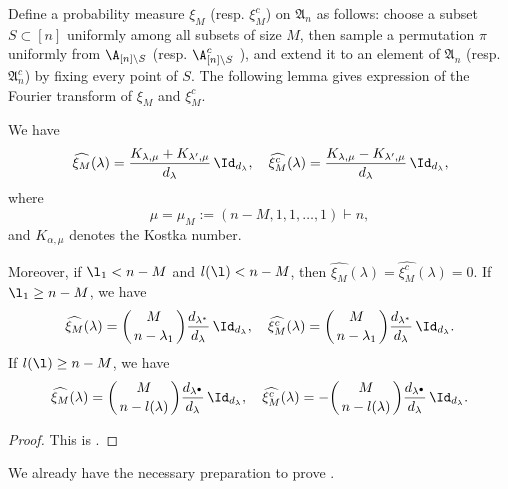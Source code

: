 Define a probability measure $\xi_M$ (resp. $\xi_M^c$) on $\mathfrak{A}_n$ as follows: choose a subset $S\subset[n]$ uniformly among all subsets of size $M$, then sample a permutation $\pi$ uniformly from $\A_{[n]\setminus S}$ (resp. $\A_{[n]\setminus S}^c$ ), and extend it to an element of $\mathfrak{A}_n$ (resp. $\mathfrak{A}_n^c$) by fixing every point of $S$. The following lemma gives expression of the Fourier transform of $\xi_M$ and $\xi_M^c$.

\begin{thm}
\label{thm :zetaM_Fourier_An}
We have
$$
\widehat{\xi_M}(\lambda)=\frac{K_{\lambda,\mu}+K_{\lambda',\mu}}{d_\lambda}\,\Id_{d_\lambda}, \quad\widehat{\xi_M^c}(\lambda)=\frac{K_{\lambda,\mu}-K_{\lambda',\mu}}{d_\lambda}\,\Id_{d_\lambda},
$$
where
$$
\mu=\mu_M:=(n-M,1,1,\dots,1)\vdash n,
$$
and $K_{\alpha,\mu}$ denotes the Kostka number.

Moreover, if $\l_1<n-M$ and $l(\l)<n-M$, then $\widehat{\xi_M}(\lambda)=\widehat{\xi_M^c}(\lambda)=0$. If $\l_1\ge n-M$, we have
$$\widehat{\xi_M}(\lambda)=\binom{M}{\,n-\lambda_1\,}\frac{
d_{\lambda^*}}{d_\lambda}\,\Id_{d_\lambda},\quad\widehat{\xi_M^c}(\lambda)=\binom{M}{\,n-\lambda_1\,}\frac{
d_{\lambda^*}}{d_\lambda}\,\Id_{d_\lambda}.$$
If $l(\l)\ge n-M$, we have
$$\widehat{\xi_M}(\lambda)=\binom{M}{\,n-l(\lambda)\,}\frac{d_{\lambda^\bullet}}{d_\lambda}\,\Id_{d_\lambda},\quad\widehat{\xi_M^c}(\lambda)=-\binom{M}{\,n-l(\lambda)\,}\frac{d_{\lambda^\bullet}
}{d_\lambda}\,\Id_{d_\lambda}.$$
\end{thm}

\begin{proof}
This is \cite[Theorem 2.16]{shen2026k}.
\end{proof}

We already have the necessary preparation to prove . 

